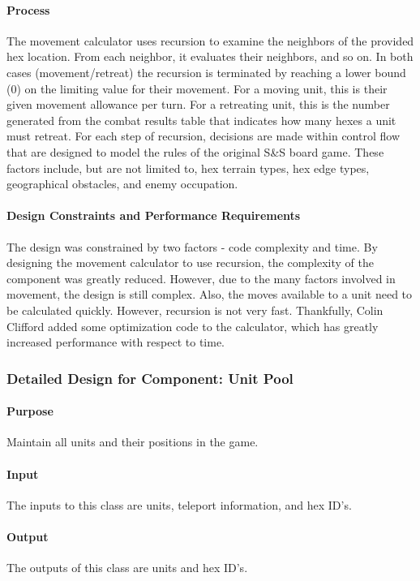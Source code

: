 \documentclass[12pt,a4paper,titlepage]{article}
\begin{document}
\paragraph{Process} The movement calculator uses recursion to examine the neighbors of the provided hex location. From each neighbor, it evaluates their neighbors, and so on. In both cases (movement/retreat) the recursion is terminated by reaching a lower bound (0) on the limiting value for their movement. For a moving unit, this is their given movement allowance per turn. For a retreating unit, this is the number generated from the combat results table that indicates how many hexes a unit must retreat. For each step of recursion, decisions are made within control flow that are designed to model the rules of the original S\&S board game. These factors include, but are not limited to, hex terrain types, hex edge types, geographical obstacles, and enemy occupation. 
\paragraph{Design Constraints and Performance Requirements} The design was constrained by two factors - code complexity and time. By designing the movement calculator to use recursion, the complexity of the component was greatly reduced. However, due to the many factors involved in movement, the design is still complex. Also, the moves available to a unit need to be calculated quickly. However, recursion is not very fast. Thankfully, Colin Clifford added some optimization code to the calculator, which has greatly increased performance with respect to time.

\subsubsection{Detailed Design for Component: Unit Pool}
\paragraph{Purpose} Maintain all units and their positions in the game.
\paragraph{Input} The inputs to this class are units, teleport information, and hex ID's.
\paragraph{Output} The outputs of this class are units and hex ID's. 
\end{document}

